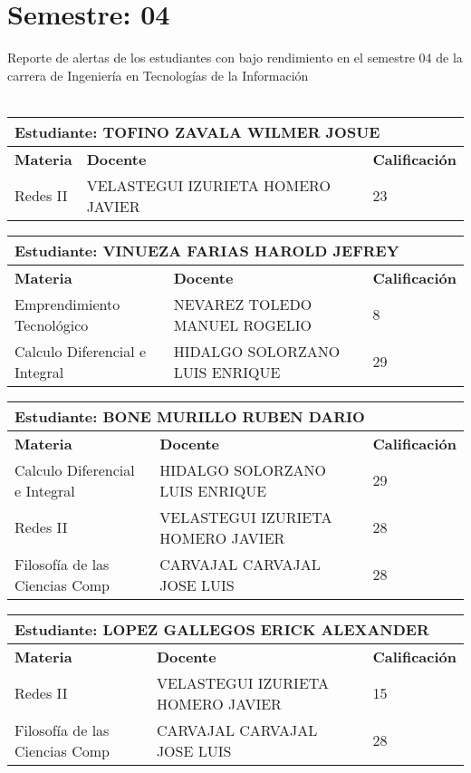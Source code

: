 \section{Semestre: 04}
        Reporte de alertas de los estudiantes con bajo rendimiento en el semestre 04 de la carrera de 
        Ingeniería en Tecnologías de la Información\\\\\small
\begin{tabularx}{\textwidth}{|p{5cm}|p{7cm}|X|}
\hline
\multicolumn{3}{|p{\dimexpr\textwidth-2\tabcolsep-2\arrayrulewidth}|}{\textbf{Estudiante: TOFINO ZAVALA WILMER JOSUE }}\\\hline
\textbf{Materia} & \textbf{Docente} & \textbf{Calificación} \\ \hline
Redes II & VELASTEGUI IZURIETA HOMERO JAVIER  & 23 \\ \hline
\end{tabularx}\vspace{10mm}
\small
\begin{tabularx}{\textwidth}{|p{5cm}|p{7cm}|X|}
\hline
\multicolumn{3}{|p{\dimexpr\textwidth-2\tabcolsep-2\arrayrulewidth}|}{\textbf{Estudiante: VINUEZA FARIAS HAROLD JEFREY }}\\\hline
\textbf{Materia} & \textbf{Docente} & \textbf{Calificación} \\ \hline
Emprendimiento Tecnológico & NEVAREZ TOLEDO MANUEL ROGELIO  & 8 \\ \hline
Calculo Diferencial e Integral & HIDALGO SOLORZANO LUIS ENRIQUE  & 29 \\ \hline
\end{tabularx}\vspace{10mm}
\small
\begin{tabularx}{\textwidth}{|p{5cm}|p{7cm}|X|}
\hline
\multicolumn{3}{|p{\dimexpr\textwidth-2\tabcolsep-2\arrayrulewidth}|}{\textbf{Estudiante: BONE MURILLO RUBEN DARIO }}\\\hline
\textbf{Materia} & \textbf{Docente} & \textbf{Calificación} \\ \hline
Calculo Diferencial e Integral & HIDALGO SOLORZANO LUIS ENRIQUE  & 29 \\ \hline
Redes II & VELASTEGUI IZURIETA HOMERO JAVIER  & 28 \\ \hline
Filosofía de las Ciencias Comp & CARVAJAL CARVAJAL JOSE LUIS  & 28 \\ \hline
\end{tabularx}\vspace{10mm}
\small
\begin{tabularx}{\textwidth}{|p{5cm}|p{7cm}|X|}
\hline
\multicolumn{3}{|p{\dimexpr\textwidth-2\tabcolsep-2\arrayrulewidth}|}{\textbf{Estudiante: LOPEZ GALLEGOS ERICK ALEXANDER }}\\\hline
\textbf{Materia} & \textbf{Docente} & \textbf{Calificación} \\ \hline
Redes II & VELASTEGUI IZURIETA HOMERO JAVIER  & 15 \\ \hline
Filosofía de las Ciencias Comp & CARVAJAL CARVAJAL JOSE LUIS  & 28 \\ \hline
\end{tabularx}\vspace{10mm}
